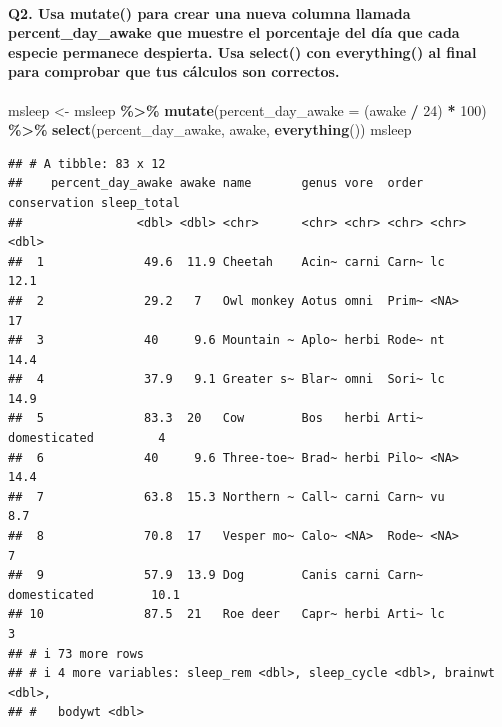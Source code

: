 \documentclass[
]{article}
\newenvironment{Shaded}{\begin{snugshade}}{\end{snugshade}}
\newcommand{\AttributeTok}[1]{\textcolor[rgb]{0.13,0.29,0.53}{#1}}
\newcommand{\DecValTok}[1]{\textcolor[rgb]{0.00,0.00,0.81}{#1}}
\newcommand{\FunctionTok}[1]{\textcolor[rgb]{0.13,0.29,0.53}{\textbf{#1}}}
\newcommand{\NormalTok}[1]{#1}
\newcommand{\OtherTok}[1]{\textcolor[rgb]{0.56,0.35,0.01}{#1}}
\newcommand{\SpecialCharTok}[1]{\textcolor[rgb]{0.81,0.36,0.00}{\textbf{#1}}}
\begin{document}
\paragraph{Q2. Usa mutate() para crear una nueva columna llamada
percent\_day\_awake que muestre el porcentaje del día que cada especie
permanece despierta. Usa select() con everything() al final para
comprobar que tus cálculos son
correctos.}\label{q2.-usa-mutate-para-crear-una-nueva-columna-llamada-percent_day_awake-que-muestre-el-porcentaje-del-duxeda-que-cada-especie-permanece-despierta.-usa-select-con-everything-al-final-para-comprobar-que-tus-cuxe1lculos-son-correctos.}

\begin{Shaded}
\begin{Highlighting}[]
\NormalTok{  msleep }\OtherTok{\textless{}{-}}\NormalTok{  msleep }\SpecialCharTok{\%\textgreater{}\%} 
  \FunctionTok{mutate}\NormalTok{(}\AttributeTok{percent\_day\_awake =}\NormalTok{ (awake }\SpecialCharTok{/} \DecValTok{24}\NormalTok{) }\SpecialCharTok{*} \DecValTok{100}\NormalTok{) }\SpecialCharTok{\%\textgreater{}\%} 
  \FunctionTok{select}\NormalTok{(percent\_day\_awake, awake, }\FunctionTok{everything}\NormalTok{())}
\NormalTok{msleep}
\end{Highlighting}
\end{Shaded}

\begin{verbatim}
## # A tibble: 83 x 12
##    percent_day_awake awake name       genus vore  order conservation sleep_total
##                <dbl> <dbl> <chr>      <chr> <chr> <chr> <chr>              <dbl>
##  1              49.6  11.9 Cheetah    Acin~ carni Carn~ lc                  12.1
##  2              29.2   7   Owl monkey Aotus omni  Prim~ <NA>                17  
##  3              40     9.6 Mountain ~ Aplo~ herbi Rode~ nt                  14.4
##  4              37.9   9.1 Greater s~ Blar~ omni  Sori~ lc                  14.9
##  5              83.3  20   Cow        Bos   herbi Arti~ domesticated         4  
##  6              40     9.6 Three-toe~ Brad~ herbi Pilo~ <NA>                14.4
##  7              63.8  15.3 Northern ~ Call~ carni Carn~ vu                   8.7
##  8              70.8  17   Vesper mo~ Calo~ <NA>  Rode~ <NA>                 7  
##  9              57.9  13.9 Dog        Canis carni Carn~ domesticated        10.1
## 10              87.5  21   Roe deer   Capr~ herbi Arti~ lc                   3  
## # i 73 more rows
## # i 4 more variables: sleep_rem <dbl>, sleep_cycle <dbl>, brainwt <dbl>,
## #   bodywt <dbl>
\end{verbatim}
\end{document}

